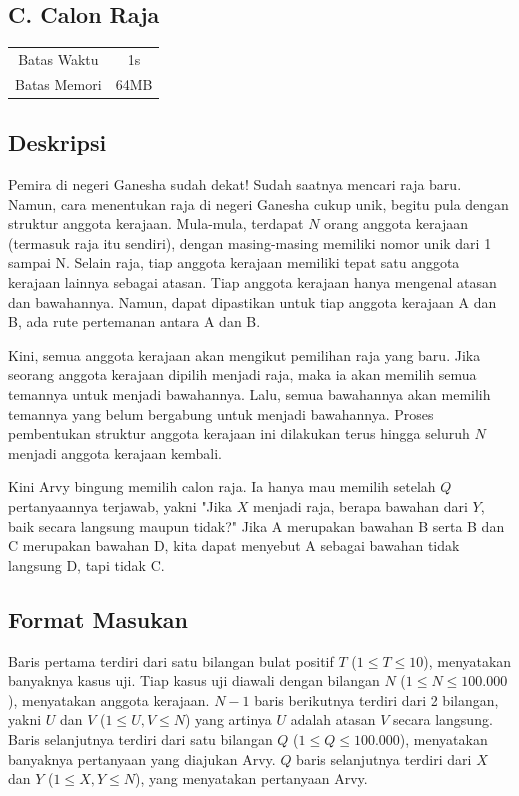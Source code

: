 \documentclass{article}
\begin{document}
\begin{center}
    \section*{C. Calon Raja}

    \begin{tabular}{ | c c | }
        \hline
        Batas Waktu  & 1s \\
        Batas Memori & 64MB \\
        \hline
    \end{tabular}
\end{center}

\subsection*{Deskripsi}

Pemira di negeri Ganesha sudah dekat!
Sudah saatnya mencari raja baru.
Namun, cara menentukan raja di negeri Ganesha cukup unik, begitu pula dengan struktur anggota kerajaan.
Mula-mula, terdapat $N$ orang anggota kerajaan (termasuk raja itu sendiri), dengan masing-masing memiliki nomor unik dari 1 sampai N.
Selain raja, tiap anggota kerajaan memiliki tepat satu anggota kerajaan lainnya sebagai atasan.
Tiap anggota kerajaan hanya mengenal atasan dan bawahannya.
Namun, dapat dipastikan untuk tiap anggota kerajaan A dan B, ada rute pertemanan antara A dan B.

Kini, semua anggota kerajaan akan mengikut pemilihan raja yang baru.
Jika seorang anggota kerajaan dipilih menjadi raja, maka ia akan memilih semua temannya untuk menjadi bawahannya.
Lalu, semua bawahannya akan memilih temannya yang belum bergabung untuk menjadi bawahannya.
Proses pembentukan struktur anggota kerajaan ini dilakukan terus hingga seluruh $N$ menjadi anggota kerajaan kembali.

Kini Arvy bingung memilih calon raja.
Ia hanya mau memilih setelah $Q$ pertanyaannya terjawab, yakni "Jika $X$ menjadi raja, berapa bawahan dari $Y$, baik secara langsung maupun tidak?"
Jika A merupakan bawahan B serta B dan C merupakan bawahan D, kita dapat menyebut A sebagai bawahan tidak langsung D, tapi tidak C.

\subsection*{Format Masukan}

Baris pertama terdiri dari satu bilangan bulat positif $T$ ($1 \leq T \leq 10$), menyatakan banyaknya kasus uji.
Tiap kasus uji diawali dengan bilangan $N$ ($1 \leq N \leq 100.000$), menyatakan anggota kerajaan.
$N - 1$ baris berikutnya terdiri dari 2 bilangan, yakni $U$ dan $V$ ($1 \leq U, V \leq N$) yang artinya $U$ adalah atasan $V$ secara langsung.
Baris selanjutnya terdiri dari satu bilangan $Q$ ($1 \leq Q \leq 100.000$), menyatakan banyaknya pertanyaan yang diajukan Arvy.
$Q$ baris selanjutnya terdiri dari $X$ dan $Y$ ($1 \leq X, Y \leq N$), yang menyatakan pertanyaan Arvy.
\end{document}
